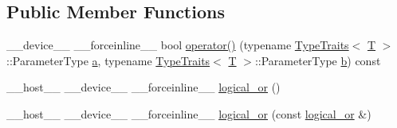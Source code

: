 \subsection*{Public Member Functions}
\begin{DoxyCompactItemize}
\item 
\-\_\-\-\_\-device\-\_\-\-\_\- \-\_\-\-\_\-forceinline\-\_\-\-\_\- bool \hyperlink{structcv_1_1gpu_1_1device_1_1logical__or_a1a608668d712c4d6dba0fc5f39ae9165}{operator()} (typename \hyperlink{structcv_1_1gpu_1_1device_1_1TypeTraits}{Type\-Traits}$<$ \hyperlink{calib3d_8hpp_a3efb9551a871ddd0463079a808916717}{T} $>$\-::Parameter\-Type \hyperlink{legacy_8hpp_a1031d0e0a97a340abfe0a6ab9e831045}{a}, typename \hyperlink{structcv_1_1gpu_1_1device_1_1TypeTraits}{Type\-Traits}$<$ \hyperlink{calib3d_8hpp_a3efb9551a871ddd0463079a808916717}{T} $>$\-::Parameter\-Type \hyperlink{legacy_8hpp_ac04272e8ca865b8fba18d36edae9fd2a}{b}) const 
\item 
\-\_\-\-\_\-host\-\_\-\-\_\- \-\_\-\-\_\-device\-\_\-\-\_\- \-\_\-\-\_\-forceinline\-\_\-\-\_\- \hyperlink{structcv_1_1gpu_1_1device_1_1logical__or_a5a1695f0f0c62b19d9763dbc87325d2e}{logical\-\_\-or} ()
\item 
\-\_\-\-\_\-host\-\_\-\-\_\- \-\_\-\-\_\-device\-\_\-\-\_\- \-\_\-\-\_\-forceinline\-\_\-\-\_\- \hyperlink{structcv_1_1gpu_1_1device_1_1logical__or_af21f11712b7ac6e4942c753294189a48}{logical\-\_\-or} (const \hyperlink{structcv_1_1gpu_1_1device_1_1logical__or}{logical\-\_\-or} \&)
\end{DoxyCompactItemize}


